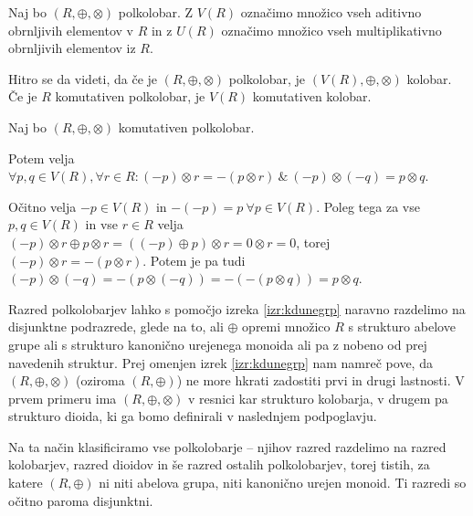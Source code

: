 \documentclass[mat1]{fmfdelo}
\begin{document}
\begin{definicija}
	Naj bo $(R, \oplus, \otimes)$ polkolobar. Z $V(R)$ označimo množico vseh aditivno obrnljivih elementov v $R$ in z $U(R)$ označimo množico vseh multiplikativno obrnljivih elementov iz $R$.
\end{definicija}

Hitro se da videti, da če je $(R, \oplus, \otimes)$ polkolobar, je $(V(R), \oplus, \otimes)$ kolobar. Če je $R$ komutativen polkolobar, je $V(R)$ komutativen kolobar.

\begin{lema} \label{lema:invvpolkolob}
	Naj bo $(R, \oplus, \otimes)$ komutativen polkolobar. 
	
	Potem velja $\forall p, q\in V(R), \forall r\in R: (-p)\otimes r = - (p\otimes r)~\&~ (-p)\otimes(-q) = p\otimes q$.
\end{lema}

\begin{dokaz}
	Očitno velja $-p\in V(R)$ in $-(-p) = p~\forall p\in V(R)$. Poleg tega za vse $p, q\in V(R)$ in vse $r\in R$ velja $(-p)\otimes r \oplus p \otimes r = ((-p) \oplus p)\otimes r = 0\otimes r = 0$, torej $(-p)\otimes r = -(p\otimes r)$. Potem je pa tudi $(-p)\otimes(-q) = -(p\otimes(-q)) = -(-(p\otimes q)) = p\otimes q$.
\end{dokaz}

	Razred polkolobarjev lahko s pomočjo izreka \ref{izr:kdunegrp} naravno razdelimo na disjunktne podrazrede, glede na to, ali $\oplus$ opremi množico $R$ s strukturo abelove grupe ali s strukturo kanonično urejenega monoida ali pa z nobeno od prej navedenih struktur. Prej omenjen izrek \ref{izr:kdunegrp} nam namreč pove, da $(R, \oplus, \otimes)$ (oziroma $(R, \oplus)$) ne more hkrati zadostiti prvi in drugi lastnosti. V prvem primeru ima $(R, \oplus, \otimes)$ v resnici kar strukturo kolobarja, v drugem pa strukturo dioida, ki ga bomo definirali v naslednjem podpoglavju.
	
	Na ta način klasificiramo vse polkolobarje -- njihov razred razdelimo na razred kolobarjev, razred dioidov in še razred ostalih polkolobarjev, torej tistih, za katere $(R, \oplus)$ ni niti abelova grupa, niti kanonično urejen monoid. Ti razredi so očitno paroma disjunktni.
\end{document}
